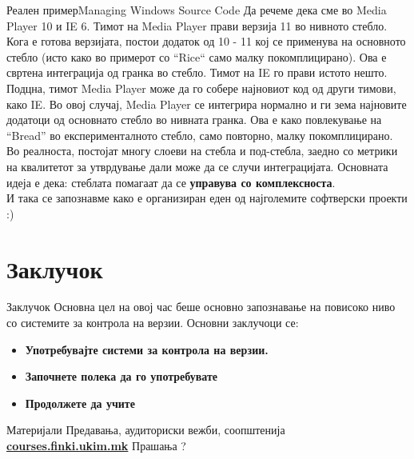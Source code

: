 \begin{frame}[shrink=10]{Реален пример}{Managing Windows Source Code}
Да речеме дека сме во Media Player 10 и IE 6. Тимот на Media Player прави
верзија 11 во нивното стебло. Кога е готова верзијата, постои додаток од 10 - 11
кој се применува на основното стебло (исто како во примерот со “Rice“ само
малку покомплицирано). Ова е свртена интеграција од гранка во стебло. Тимот на
IE го прави истото нешто.
\linebreak
Подцна, тимот Media Player може да го собере најновиот код од други тимови, како
IE. Во овој случај, Media Player се интегрира нормално и ги зема најновите
додатоци од основнато стебло во нивната гранка. Ова е како повлекување на
“Bread” во експерименталното стебло, само повторно, малку покомплицирано.
\linebreak
Во реалноста, постојат многу слоеви на стебла и под-стебла, заедно со метрики на
квалитетот за утврдување дали може да се случи интеграцијата.
Основната идеја е дека: стеблата помагаат да се \textbf{управува со
комплексноста}.\\
И така се запознавме како е организиран еден од најголемите софтверски
 проекти :)
\end{frame}

\section{Заклучок}

\begin{frame}{Заклучок}
Основна цел на овој час беше основно запознавање на повисоко ниво со системите
за контрола на верзии.
Основни заклучоци се:
\begin{itemize}
  \item \textbf{Употребувајте системи за контрола на верзии.}
  \item \textbf{Започнете полека да го употребувате}
  \item \textbf{Продолжете да учите}
\end{itemize}
\end{frame}

\begin{frame}{Материјали}{}
	Предавања, аудиториски вежби, соопштенија\\
	\href{http://courses.finki.ukim.mk/}{\textbf{courses.finki.ukim.mk}}
	\vfill
	{\Huge Прашања ?}
\end{frame}


